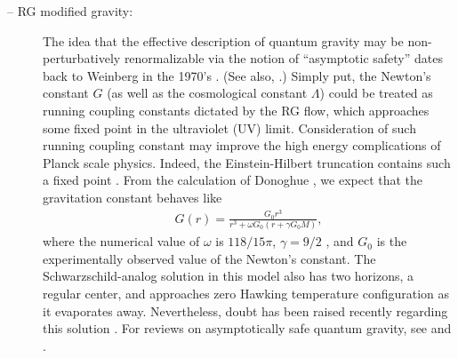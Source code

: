 \documentclass[12pt]{article}
\newcommand{\2}{$^2$}
\newcommand{\3}{$^3$}
\newcommand{\4}{$_4$}
\newcommand{\5}{$_5$}
\begin{document}
\begin{description}
\item[-- RG modified gravity:]  
The idea that the effective description of quantum gravity may be non-perturbatively renormalizable via the notion of ``asymptotic safety'' dates back to Weinberg in the 1970's \cite{weinberg1, weinberg2}. (See also, \cite{weinberg3}.)
Simply put, the Newton's constant $G$ (as well as the cosmological constant $\Lambda$) could be treated as running coupling constants dictated by the RG flow, which approaches  some fixed point in the ultraviolet (UV) limit. Consideration of such running coupling constant may improve the high energy complications of Planck scale physics. 
Indeed, the Einstein-Hilbert truncation contains such a fixed point \cite{reuter}.
From the calculation of Donoghue \cite{Donoghue:1994dn}, we expect that the gravitation constant behaves like
\begin{eqnarray}
{G}(r) = \frac{G_0r^{3}}{r^{3} + \omega G_0 \left(r+ \gamma G_0M \right)},
\end{eqnarray}
where the numerical value of $\omega$ is $118/15\pi$, $\gamma = 9/2$ \cite{Bonanno:2000ep}, and
$G_0$ is the experimentally observed value of the Newton's constant.
 The Schwarzschild-analog solution in this model also has two horizons, a regular center, and approaches zero Hawking temperature configuration as it evaporates away. Nevertheless, doubt has been raised recently regarding this solution \cite{maziashvili}. 
For reviews on asymptotically safe quantum gravity, see \cite{0610018} and \cite{0709.3851}.


\end{description}
\end{document}
